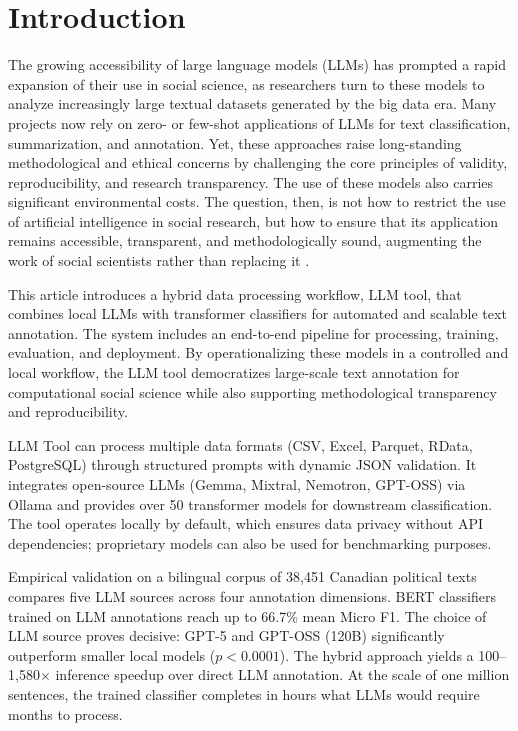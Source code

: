 \documentclass[12pt]{article}
\begin{document}
\section{Introduction}

The growing accessibility of large language models (LLMs) has prompted a rapid expansion of their use in social science, as researchers turn to these models to analyze increasingly large textual datasets generated by the big data era. Many projects now rely on zero- or few-shot applications of LLMs for text classification, summarization, and annotation. Yet, these approaches raise long-standing methodological and ethical concerns by challenging the core principles of validity, reproducibility, and research transparency. The use of these models also carries significant environmental costs. The question, then, is not how to restrict the use of artificial intelligence in social research, but how to ensure that its application remains accessible, transparent, and methodologically sound, augmenting the work of social scientists rather than replacing it \parencite{grimmer_stewart13, do_etal24}.

This article introduces a hybrid data processing workflow, LLM tool, that combines local LLMs with transformer classifiers for automated and scalable text annotation. The system includes an end-to-end pipeline for processing, training, evaluation, and deployment. By operationalizing these models in a controlled and local workflow, the LLM tool democratizes large-scale text annotation for computational social science while also supporting methodological transparency and reproducibility.

LLM Tool can process multiple data formats (CSV, Excel, Parquet, RData, PostgreSQL) through structured prompts with dynamic JSON validation. It integrates open-source LLMs (Gemma, Mixtral, Nemotron, GPT-OSS) via Ollama and provides over 50 transformer models for downstream classification. The tool operates locally by default, which ensures data privacy without API dependencies; proprietary models can also be used for benchmarking purposes.

Empirical validation on a bilingual corpus of 38,451 Canadian political texts compares five LLM sources across four annotation dimensions. BERT classifiers trained on LLM annotations reach up to 66.7\% mean Micro F1. The choice of LLM source proves decisive: GPT-5 and GPT-OSS (120B) significantly outperform smaller local models ($p < 0.0001$). The hybrid approach yields a 100--1,580$\times$ inference speedup over direct LLM annotation. At the scale of one million sentences, the trained classifier completes in hours what LLMs would require months to process.
\end{document}

